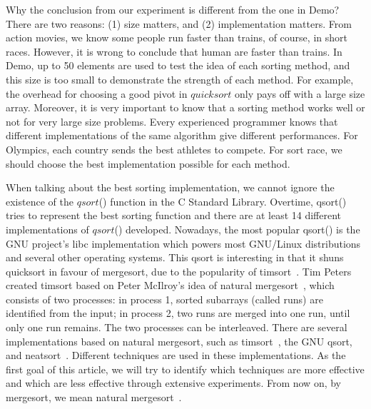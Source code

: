 \documentclass[AMA,STIX1COL]{WileyNJD-v2}
\newcommand{\qusort}{$quicksort$ }
\newcommand{\qsortn}{$qsort$}
\begin{document}
Why the conclusion from our experiment is different from the one in Demo? 
There are two reasons: (1) size matters, and (2) implementation matters. 
From action movies, we know some people run faster than trains, of course, in short races. 
However, it is wrong to conclude that human are faster than trains. 
In Demo, up to 50 elements are used to test the idea of each sorting method, and this size is too small to demonstrate the strength of each method. 
For example, the overhead for choosing a good pivot in \qusort only pays off with a large size array. 
Moreover, it is very important to know that a sorting method works well or not for very large size problems. 
Every experienced programmer knows that different implementations of the same algorithm give different performances. 
For Olympics, each country sends the best athletes to compete. 
For sort race, we should choose the best implementation possible for each method.

When talking about the best sorting implementation, we cannot ignore the existence of the \qsortn() function in the C Standard Library.
Overtime, qsort() tries to represent the best sorting function and there are at least 14 different implementations of \qsortn() developed. Nowadays, the most popular qsort() is the GNU project’s libc implementation which powers most GNU/Linux distributions and several other operating systems. 
This qsort is interesting in that it shuns quicksort in favour of mergesort, due to the popularity of timsort~\cite{timsort}.  
Tim Peters created timsort based on Peter McIlroy’s idea of natural mergesort~\cite{mcilroy1993optimistic}, which consists of two processes: in process 1, sorted subarrays (called runs) are identified from the input; in process 2, two runs are merged into one run, until only one run remains. 
The two processes can be interleaved. 
There are several implementations based on natural mergesort, such as timsort~\cite{timsort}, the GNU qsort, and neatsort~\cite{la2014neatsort}. Different techniques are used in these implementations. 
As the first goal of this article, we will try to identify which techniques are more effective and which are less effective through extensive experiments. 
From now on, by mergesort, we mean natural mergesort~\cite{mcilroy1993optimistic}.
\end{document}
